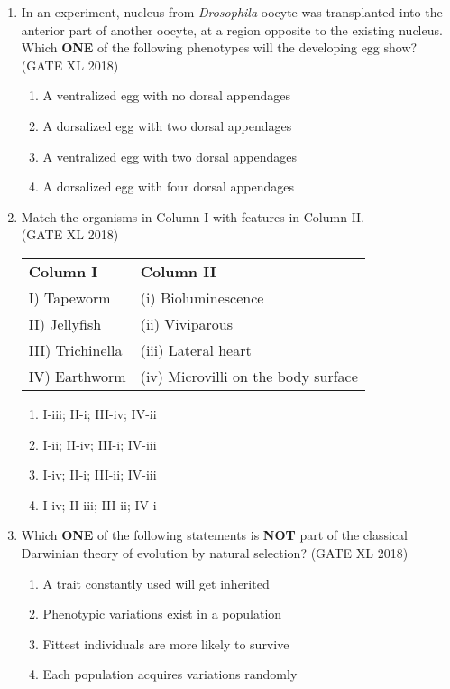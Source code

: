 \documentclass[14pt]{extarticle}
\begin{document}
\begin{flushleft}
\begin{enumerate}
    \item In an experiment, nucleus from  \textit{Drosophila} oocyte  was transplanted into the anterior part of another oocyte, at a region opposite to the existing nucleus. Which \textbf{ONE} of the 
    following phenotypes will the developing egg show?\\  \hfill(GATE XL 2018)\\
    \begin{enumerate}
        \item A ventralized egg with no dorsal appendages
        \item A dorsalized egg with two dorsal appendages
        \item A ventralized egg with two dorsal appendages
        \item A dorsalized egg with four dorsal appendages
    \end{enumerate}

    \item Match the organisms in Column I with features in Column II.\\ 
    \hfill(GATE XL 2018)\\
\begin{tabular}{p{6cm} p{6cm}}
\textbf{Column I} & \textbf{Column II} \\
I) Tapeworm & (i) Bioluminescence \\
II) Jellyfish & (ii) Viviparous \\
III) Trichinella & (iii) Lateral heart \\
IV) Earthworm & (iv) Microvilli on the body surface \\
\end{tabular}
    \begin{multicols}{2}
    \begin{enumerate}
        \item I-iii; II-i; III-iv; IV-ii
        \item I-ii; II-iv; III-i; IV-iii
        \item I-iv; II-i; III-ii; IV-iii
        \item I-iv; II-iii; III-ii; IV-i
    \end{enumerate}
    \end{multicols}

    \item Which \textbf{ONE} of the following statements is \textbf{NOT} part of the classical Darwinian theory of evolution by natural selection? \hfill(GATE XL 2018)\\
    \begin{enumerate}
        \item A trait constantly used will get inherited
        \item Phenotypic variations exist in a population
        \item Fittest individuals are more likely to survive
        \item Each population acquires variations randomly
    \end{enumerate}


\end{enumerate}
\end{flushleft}
\end{document}
